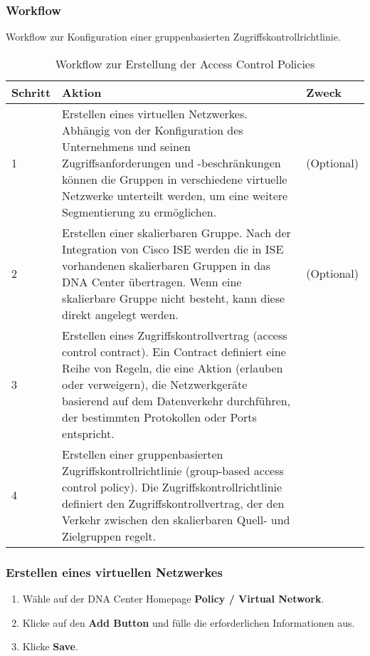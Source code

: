 \subsubsection{Workflow}
Workflow zur Konfiguration einer gruppenbasierten Zugriffskontrollrichtlinie.

\begin{table}[H]
	\centering
	\begin{tabularx}{\textwidth}{p{2 cm} | X | p{2 cm}}
		\rowcolor{gray!50}
		\textbf{Schritt} & \textbf{Aktion} & \textbf{Zweck} \\
		\hline	
		1 & Erstellen eines virtuellen Netzwerkes. Abhängig von der Konfiguration des Unternehmens und seinen Zugriffsanforderungen und -beschränkungen können die Gruppen in verschiedene virtuelle Netzwerke unterteilt werden, um eine weitere Segmentierung zu ermöglichen. & (Optional) \\
		2 & Erstellen einer skalierbaren Gruppe. Nach der Integration von Cisco ISE werden die in ISE vorhandenen skalierbaren Gruppen in das DNA Center übertragen. Wenn eine skalierbare Gruppe nicht besteht, kann diese direkt angelegt werden. & (Optional) \\
		3 & Erstellen eines Zugriffskontrollvertrag (access control contract). Ein Contract definiert eine Reihe von Regeln, die eine Aktion (erlauben oder verweigern), die Netzwerkgeräte basierend auf dem Datenverkehr durchführen, der bestimmten Protokollen oder Ports entspricht. & \\
		4 & Erstellen einer gruppenbasierten Zugriffskontrollrichtlinie (group-based access control policy). Die Zugriffskontrollrichtlinie definiert den Zugriffskontrollvertrag, der den Verkehr zwischen den skalierbaren Quell- und Zielgruppen regelt. & \\
		
	\end{tabularx}
	\caption{Workflow zur Erstellung der Access Control Policies}
	\label{tab:Workflow zur Erstellung der Access Control Policies}
\end{table}

\subsubsection{Erstellen eines virtuellen Netzwerkes}
\begin{enumerate}
	\item Wähle auf der DNA Center Homepage \textbf{Policy / Virtual Network}.
	\item Klicke auf den \textbf{Add Button} und fülle die erforderlichen Informationen aus.
	\item Klicke \textbf{Save}.
\end{enumerate}

